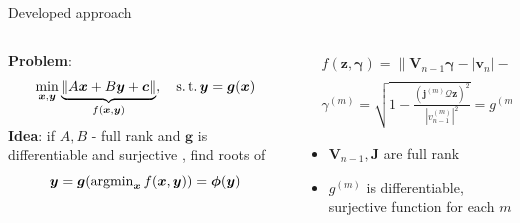 \documentclass[../main.tex]{subfiles}
\begin{document}
%
%



\begin{frame}[t]{Developed approach}
\begin{columns}
\colorbox{gray!20}{\begin{column}{0.5\textwidth}

\textbf{Problem}:
\begin{equation*}
\min_{\bm{x}, \bm{y}} \underbrace{\|A\bm{x} + B\bm{y} + \bm{c}\|}_{f(\bm{x}, \bm{y})}, \quad \operatorname{s.t.} \bm{y} = \bm{g}(\bm{x})
\end{equation*}
\textbf{Idea}: if $A, B$ - full rank and $\bm{g}$ is differentiable and surjective \cite{iakovlev2018fixed}, find roots of 
$$\bm{y} = \bm{g}(\operatorname{argmin}_{\bm{x}} f(\bm{x}, \bm{y})) = \bm{\phi}(\bm{y})$$ 
\end{column}}


\begin{column}{0.5\textwidth}
\begin{equation*}
\begin{split}
& f(\bm{z}, \bm{\gamma}) = \Big\| \bm{V}_{n-1}\bm{\gamma} - |\bm{v}_{n}| - \bm{J}\bm{z} \Big\|_2^2 \\
& \gamma^{(m)} = \sqrt{1 - \frac{( \bm{j}^{(m)}\mathcal{Q}\bm{z} )^2}{|v^{(m)}_{n-1}|^2} } = g^{(m)}(\bm{z})
\end{split}
\end{equation*}

\begin{itemize}
		\item $\bm{V}_{n-1}, \bm{J}$ are full rank
		\item $g^{(m)}$ is differentiable, surjective function for each $m$
	\end{itemize}

\end{column}
\end{columns}

\end{frame}
\end{document}
